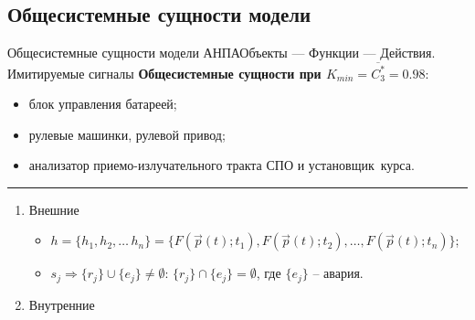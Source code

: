 \subsection{Общесистемные сущности модели}
\begin{frame}{Общесистемные сущности модели АНПА}{Объекты --- Функции --- Действия. Имитируемые сигналы}
    \textbf{Общесистемные сущности при $K_{min} = \overline{C_3^*} = 0.98$}:
    \begin{itemize}
        \item<first@1->[2.0]  блок управления батареей;
        \item<second@1->[1.5] рулевые машинки, рулевой привод;
        \item<third@1->[1.33] анализатор приемо-излучательного тракта СПО и установщик~курса.
    \end{itemize}
    \hrule{}\begin{enumerate}
        \item<2-> Внешние
        \begin{itemize}
            \item<2->[Глубина] $h = \{h_1, h_2, \ldots\, h_n\} = \{F(\vec p(t); t_1), F(\vec p(t); t_2), \ldots, F(\vec p(t); t_n)\}$;
            \item<3->[Эхо-сигнал] $s_j \Rightarrow \{r_j\} \cup \{e_j\} \ne \emptyset:\,\{r_j\} \cap \{e_j\} = \emptyset$,
                где $\{e_j\}$ -- авария.
        \end{itemize}\vspace{5pt}
        \item<2-> Внутренние

\end{enumerate}
\end{frame}
